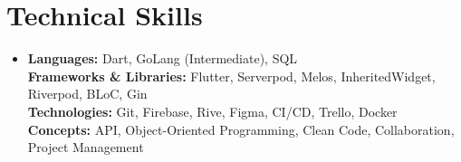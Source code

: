 \section{Technical Skills}
\begin{itemize}[leftmargin=0.15in, label={}]
  \small
  \item{
    \textbf{Languages:} Dart, GoLang (Intermediate), SQL \\
    \textbf{Frameworks \& Libraries:} Flutter, Serverpod, Melos, InheritedWidget, Riverpod, BLoC, Gin \\
    \textbf{Technologies:} Git, Firebase, Rive, Figma, CI/CD, Trello, Docker \\
    \textbf{Concepts:} API, Object-Oriented Programming, Clean Code, Collaboration, Project Management
  }
\end{itemize}
